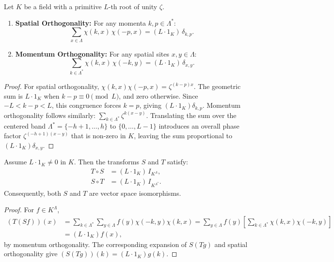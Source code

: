 \begin{theorem}
\label{thm:fourier_orthogonality}
Let $K$ be a field with a primitive $L$-th root of unity $\zeta$.
\begin{enumerate}
    \item \textbf{Spatial Orthogonality:} For any momenta $k, p \in \Lambda^*$:
    \begin{equation}
    \sum_{x \in \Lambda} \chi(k, x)\, \chi(-p, x) = (L \cdot 1_K)\, \delta_{k, p}.
    \end{equation}
    \item \textbf{Momentum Orthogonality:} For any spatial sites $x, y \in \Lambda$:
    \begin{equation}
    \sum_{k \in \Lambda^*} \chi(k, x)\, \chi(-k, y) = (L \cdot 1_K)\, \delta_{x, y}.
    \end{equation}
\end{enumerate}
\end{theorem}

\begin{proof}
For spatial orthogonality, $\chi(k,x)\chi(-p,x)=\zeta^{(k-p)x}$. The geometric sum is $L\cdot1_K$ when $k-p\equiv0\pmod L$, and zero otherwise. Since $-L<k-p<L$, this congruence forces $k=p$, giving $(L\cdot1_K)\delta_{k,p}$.
Momentum orthogonality follows similarly: $\sum_{k \in \Lambda^*} \zeta^{k (x-y)}$. Translating the sum over the centered band $\Lambda^* = \{-h+1, \dots, h\}$ to $\{0, \dots, L-1\}$ introduces an overall phase factor $\zeta^{(-h+1)(x-y)}$ that is non-zero in $K$, leaving the sum proportional to $(L \cdot 1_K) \delta_{x, y}$.
\end{proof}

\begin{theorem}
\label{thm:algebraic_inversion}
Assume $L \cdot 1_K \neq 0$ in $K$. Then the transforms $S$ and $T$ satisfy:
\begin{align}
T \circ S &= (L \cdot 1_K)\, I_{K^\Lambda}, \\
S \circ T &= (L \cdot 1_K)\, I_{K^{\Lambda^*}}.
\end{align}
Consequently, both $S$ and $T$ are vector space isomorphisms.
\end{theorem}

\begin{proof}
For $f\in K^\Lambda$,
\begin{align}
(T(Sf))(x)&=\sum_{k\in\Lambda^*}\sum_{y\in\Lambda}f(y)\chi(-k,y)\chi(k,x)
=\sum_{y\in\Lambda}f(y)\left[\sum_{k\in\Lambda^*}\chi(k,x)\chi(-k,y)\right]\\
&=(L\cdot1_K)f(x),
\end{align}
by momentum orthogonality. The corresponding expansion of $S(Tg)$ and spatial orthogonality give $(S(Tg))(k)=(L\cdot1_K)g(k)$.
\end{proof}

